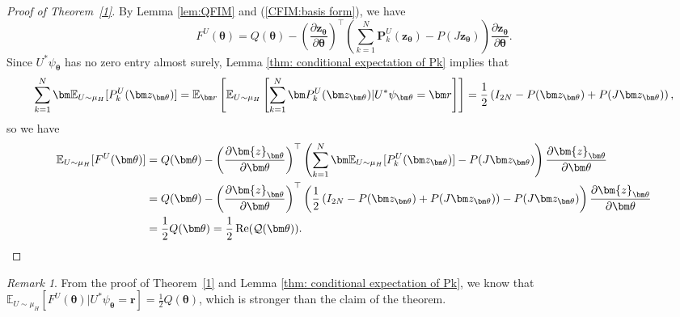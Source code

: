 \documentclass{amsart}
\theoremstyle{plain}
\theoremstyle{definition}
\theoremstyle{remark}
\newtheorem{remark}{Remark}
\newcommand{\thmref}[1]{Theorem~\ref{#1}}
\newcommand{\EE}{\mathbb{E}}
\begin{document}
\begin{proof}[Proof of \thmref{1}]
    By Lemma \ref{lem:QFIM} and (\ref{CFIM:basis form}), we have 
    \[F^U(\bm\theta)=Q(\bm\theta)-\left(\frac{\partial \bm{z}_{\bm\theta}}{\partial\bm\theta}\right)^\top\left(\sum\limits_{k=1}^N\bm P_k^U(\bm z_{\bm\theta})-P(J\bm z_{\bm\theta})\right)\frac{\partial \bm{z}_{\bm\theta}}{\partial\bm\theta}.\]
    Since $U^*\psi_{\bm\theta}$ has no zero entry almost surely, Lemma \ref{thm: conditional expectation of Pk} implies that 
    \[\sum\limits_{k=1}^N\bm \EE_{U\sim\mu_H}[P_k^U(\bm z_{\bm\theta})]=\EE_{\bm r}\left[\EE_{U\sim\mu_H}\left[\sum\limits_{k=1}^N\bm P_k^U(\bm z_{\bm\theta})|U^*\psi_{\bm\theta}=\bm r\right]\right]=\frac{1}{2}\left(I_{2N}-P(\bm z_{\bm\theta})+P(J\bm z_{\bm\theta})\right),\] 
    so we have
    \begin{align*}
        \EE_{U\sim\mu_H}[F^U(\bm\theta)]&=Q(\bm\theta)-\left(\frac{\partial \bm{z}_{\bm\theta}}{\partial\bm\theta}\right)^\top\left(\sum\limits_{k=1}^N\bm \EE_{U\sim\mu_H}[P_k^U(\bm z_{\bm\theta})]-P(J\bm z_{\bm\theta})\right)\frac{\partial \bm{z}_{\bm\theta}}{\partial\bm\theta}\\
        &=Q(\bm\theta)-\left(\frac{\partial \bm{z}_{\bm\theta}}{\partial\bm\theta}\right)^\top\left(\frac{1}{2}\left(I_{2N}-P(\bm z_{\bm\theta})+P(J\bm z_{\bm\theta})\right)-P(J\bm z_{\bm\theta})\right)\frac{\partial \bm{z}_{\bm\theta}}{\partial\bm\theta}\\
        &=\frac{1}{2}Q(\bm\theta)=\frac{1}{2}\operatorname{Re}(\mathcal{Q}(\bm\theta)). \qedhere
    \end{align*}
\end{proof}
\begin{remark}
    From the proof of \thmref{1} and Lemma \ref{thm: conditional expectation of Pk}, we know that $\EE_{U\sim\mu_H}[F^U(\bm\theta)|U^*\psi_{\bm\theta}=\bm r]=\frac{1}{2}Q(\bm\theta)$, which is stronger than the claim of the theorem. 
\end{remark}
\end{document}
